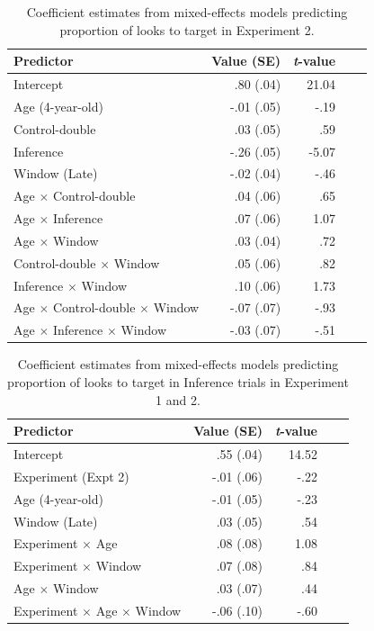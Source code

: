 \documentclass[10pt,letterpaper]{article}
\begin{document}
\begin{table}[b!]
\caption{\label{tab:lmer3}  Coefficient estimates from mixed-effects models predicting proportion of looks to target in Experiment 2.} 
\begin{center} 
\begin{tabular}{l r r r l} 
\hline
Predictor  &  Value (SE) & \emph{t}-value\\
\hline
Intercept  & .80 (.04) & 21.04 \\
Age (4-year-old) & -.01 (.05) &  -.19 \\
Control-double & .03 (.05) & .59 \\
Inference & -.26 (.05) & -5.07 \\
Window (Late) & -.02 (.04) & -.46 \\
Age $\times$  Control-double & .04 (.06) & .65 \\
Age $\times$  Inference & .07 (.06) & 1.07 \\
Age $\times$  Window & .03 (.04) & .72 \\
Control-double $\times$  Window & .05 (.06) & .82 \\
Inference $\times$ Window & .10 (.06) & 1.73 \\
Age $\times$ Control-double $\times$ Window & -.07 (.07) & -.93 \\
Age $\times$ Inference $\times$ Window & -.03 (.07) & -.51 \\
\hline
\end{tabular} 
\end{center} 
\end{table}

\begin{table}[b!]
\caption{\label{tab:lmer4}  Coefficient estimates from mixed-effects models predicting proportion of looks to target in Inference trials in Experiment 1 and 2.} 
\begin{center} 
\begin{tabular}{l r r r l} 
\hline
Predictor  &  Value (SE) & \emph{t}-value\\
\hline
Intercept  & .55 (.04) & 14.52 \\
Experiment (Expt 2)  & -.01 (.06) &  -.22 \\
Age (4-year-old) & -.01 (.05) &  -.23 \\
Window (Late) & .03 (.05) & .54 \\
Experiment $\times$  Age & .08 (.08) & 1.08 \\
Experiment $\times$  Window & .07 (.08) & .84 \\
Age $\times$  Window & .03 (.07) & .44 \\
Experiment $\times$ Age $\times$ Window & -.06 (.10) & -.60 \\
\hline
\end{tabular} 
\end{center} 
\end{table}
\end{document}
